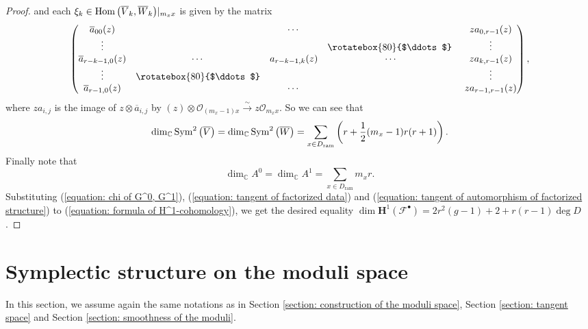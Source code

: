 \documentclass[pdftex]{sigma}
\numberwithin{equation}{section}
\newcommand\Hom{\mathop{\rm Hom}\nolimits}
\newcommand{\Sym}{\mathop{\rm Sym}\nolimits}
\begin{document}
\begin{proof}
and each $\xi_k\in\Hom\big(\overline{V}_k,\overline{W}_k\big)|_{m_xx}$ is given by the matrix
\[
 \begin{pmatrix}
 \overline{a}_{00}(z) & & \cdots & & za_{0,r-1}(z) \\
 \vdots & & & \rotatebox{80}{$\ddots$} \ & \vdots \\
 \overline{a}_{r-k-1,0}(z) & \cdots & a_{r-k-1,k}(z) & \cdots & za_{k,r-1}(z) \\
 \vdots & \rotatebox{80}{$\ddots$} & & & \vdots \\
 \overline{a}_{r-1,0}(z) & & \cdots & & za_{r-1,r-1}(z)
 \end{pmatrix},
\]
where $za_{i,j}$ is the image of $z\otimes \overline{a}_{i,j}$ by
$(z)\otimes{\mathcal O}_{(m_x-1)x}\xrightarrow{\sim}
z{\mathcal O}_{m_xx}$.
So we can see that
\begin{equation} \label{equation: tangent of factorized data}
 \dim_{\mathbb{C}} \Sym^2\big(\overline{V}\big)
 =\dim_{\mathbb{C}} \Sym^2\big(\overline{W}\big)
 =\sum_{x\in D_{\mathrm{ram}}} \left( r+\frac{1}{2}(m_x-1)r(r+1) \right).
\end{equation}
Finally note that
\begin{equation} \label{equation: tangent of automorphism of factorized structure}
 \dim_{\mathbb{C}}A^0=\dim_{\mathbb{C}}A^1=\sum_{x\in D_{\mathrm{ram}}} m_x r.
\end{equation}
Substituting (\ref{equation: chi of G^0, G^1}), (\ref{equation: tangent of factorized data})
and (\ref{equation: tangent of automorphism of factorized structure})
to (\ref{equation: formula of H^1-cohomology}),
we get the desired equality
$\dim \mathbf{H}^1({\mathcal F}^{\bullet})
=2r^2(g-1)+2+r(r-1)\deg D$.
\end{proof}


\section {Symplectic structure on the moduli space}
\label{section: symplectic structure}


In this section, we assume again the same notations as in
Section \ref{section: construction of the moduli space},
Section \ref{section: tangent space}
and
Section \ref{section: smoothness of the moduli}.
\end{document}
